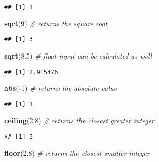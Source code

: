 \documentclass[
  12pt,
]{article}
\newenvironment{Shaded}{\begin{snugshade}}{\end{snugshade}}
\newcommand{\CommentTok}[1]{\textcolor[rgb]{0.56,0.35,0.01}{\textit{#1}}}
\newcommand{\DecValTok}[1]{\textcolor[rgb]{0.00,0.00,0.81}{#1}}
\newcommand{\FloatTok}[1]{\textcolor[rgb]{0.00,0.00,0.81}{#1}}
\newcommand{\FunctionTok}[1]{\textcolor[rgb]{0.13,0.29,0.53}{\textbf{#1}}}
\newcommand{\NormalTok}[1]{#1}
\newcommand{\SpecialCharTok}[1]{\textcolor[rgb]{0.81,0.36,0.00}{\textbf{#1}}}
\begin{document}
\begin{verbatim}
## [1] 1
\end{verbatim}

\begin{Shaded}
\begin{Highlighting}[]
\FunctionTok{sqrt}\NormalTok{(}\DecValTok{9}\NormalTok{)         }\CommentTok{\# returns the square root}
\end{Highlighting}
\end{Shaded}

\begin{verbatim}
## [1] 3
\end{verbatim}

\begin{Shaded}
\begin{Highlighting}[]
\FunctionTok{sqrt}\NormalTok{(}\FloatTok{8.5}\NormalTok{)       }\CommentTok{\# float input can be calculated as well }
\end{Highlighting}
\end{Shaded}

\begin{verbatim}
## [1] 2.915476
\end{verbatim}

\begin{Shaded}
\begin{Highlighting}[]
\FunctionTok{abs}\NormalTok{(}\SpecialCharTok{{-}}\DecValTok{1}\NormalTok{)         }\CommentTok{\# returns the absolute value}
\end{Highlighting}
\end{Shaded}

\begin{verbatim}
## [1] 1
\end{verbatim}

\begin{Shaded}
\begin{Highlighting}[]
\FunctionTok{ceiling}\NormalTok{(}\FloatTok{2.8}\NormalTok{)    }\CommentTok{\# returns the closest greater integer}
\end{Highlighting}
\end{Shaded}

\begin{verbatim}
## [1] 3
\end{verbatim}

\begin{Shaded}
\begin{Highlighting}[]
\FunctionTok{floor}\NormalTok{(}\FloatTok{2.8}\NormalTok{)      }\CommentTok{\# returns the closest smaller integer}
\end{Highlighting}
\end{Shaded}
\end{document}
